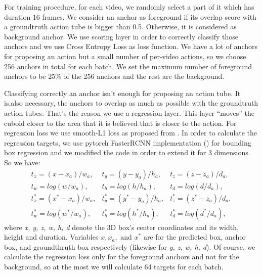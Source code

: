 For training procedure, for each video, we randomly select a part of it which has duration 16 frames. We consider an anchor as foreground if its overlap score with a groundtruth
action tube is bigger than 0.5. Otherwise, it is considered as background anchor. We use scoring layer in order to correctly classify those anchors and we use
Cross Entropy Loss as loss function. We have a lot of anchors for proposing an action but a small number of per-video actions, so we choose 256 anchors in total for each batch. We set the maximum
number of foreground anchors to be  25\% of the 256 anchors and the rest are the background.\par
Classifying correctly an anchor isn't enough for proposing an action tube. It is,also necessary, the anchors to overlap as much as possible with the groundtruth action tubes. That's the reason we use a
regression layer. This layer ``moves'' the cuboid closer to the area that it is believed that is closer to the action.
For regression loss we use smooth-L1 loss as proposed from \cite{DBLP:journals/corr/GirshickDDM13}. In order to calculate
the regression targets, we use pytorch FasterRCNN implementation (\cite{jjfaster2rcnn}) for bounding box regression and 
we modified the code in order to extend it for 3 dimensions. %
So we have:
\[ \begin{matrix}
    t_x = (x-x_a)/w_a, & t_y = (y-y_a)/h_a, & t_z= (z-z_a)/d_a, \\
    t_w= log(w/w_a), & t_h= log(h/h_a), & t_d = log(d/d_a), \\
    t^*_x = (x^* - x_a)/w_a, & t^*_y = (y^* - y_a)/h_a, & t^*_z = (z^* - z_a)/d_a, \\
    t^*_w = log(w^* /w_a), & t^*_h = log(h^*/h_a), & t^*_d = log(d^*/d_a),
  \end{matrix}
\]
where \textit{x, y, z, w, h, d} denote the 3D box's center coordinates and its width, height and duration. Variables $x, x_a, \text{ and } x^*$
are for the predicted box, anchor box, and groundthruth box respectively (likewise for \textit{y, z, w, h, d}). Of course, we calculate the
regression loss only for the foreground anchors and not for the background, so at the most we will calculate 64 targets
for each batch. \par

